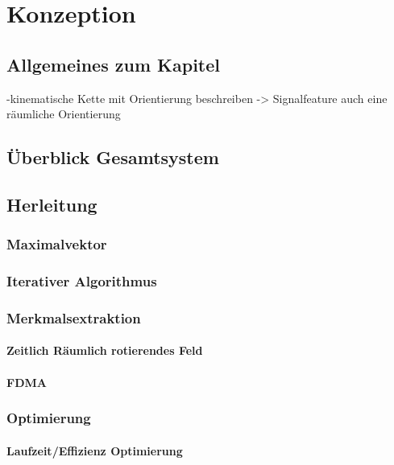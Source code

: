 \chapter{Konzeption}
\label{chap:char_konzept}
   
   \section{Allgemeines zum Kapitel}
   \label{sec:konzept_allgemeines}
 
-kinematische Kette mit Orientierung beschreiben
-> Signalfeature auch eine räumliche Orientierung

  \section{Überblick Gesamtsystem}
   \label{sec:Overview}
   \section{Herleitung}
   \label{sec:konzept_herleitung}
   
		\subsection{Maximalvektor}

		\subsection{Iterativer Algorithmus}

		\subsection{Merkmalsextraktion}

			\subsubsection{Zeitlich Räumlich rotierendes Feld}

			\subsubsection{FDMA}

		\subsection{Optimierung}

			\subsubsection{Laufzeit/Effizienz Optimierung}

